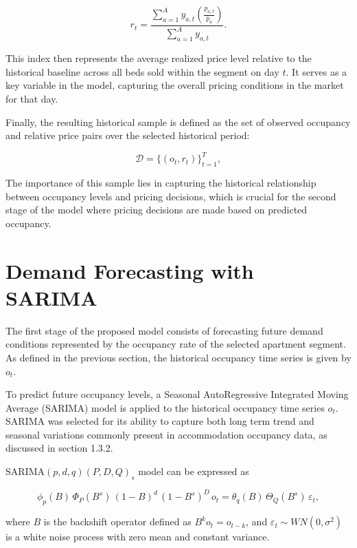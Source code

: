 \begin{equation}
    r_t=
    \frac{\sum_{a=1}^{A} y_{a,t}\left(\frac{p_{a,t}}{\bar{p}_a}\right)}
    {\sum_{a=1}^{A} y_{a,t}}.
\end{equation}

This index then represents the average realized price level relative to the historical baseline across all beds sold within the segment on day $t$. It serves as a key variable in the model, capturing the overall pricing conditions in the market for that day.

Finally, the resulting historical sample is defined as the set of observed occupancy and relative price pairs over the selected historical period:

\begin{equation}
    \mathcal D = {\{(o_t, r_t)\}}_{t=1}^T,
\end{equation}

The importance of this sample lies in capturing the historical relationship between occupancy levels and pricing decisions, which is crucial for the second stage of the model where pricing decisions are made based on predicted occupancy.


\section{Demand Forecasting with SARIMA}
The first stage of the proposed model consists of forecasting future demand conditions represented by the occupancy rate of the selected apartment segment. As defined in the previous section, the historical occupancy time series is given by $o_t$.

To predict future occupancy levels, a Seasonal AutoRegressive Integrated Moving Average (SARIMA) model is applied to the historical occupancy time series $o_t$. SARIMA was selected for its ability to capture both long term trend and seasonal variations commonly present in accommodation occupancy data, as discussed in section 1.3.2.

$\mathrm{SARIMA}(p,d,q)(P,D,Q)_s$ model can be expressed as

\begin{equation}
    \phi_p(B)\,\Phi_P(B^s)\,(1-B)^d\,(1-B^s)^D\, o_t
    =
    \theta_q(B)\,\Theta_Q(B^s)\,\varepsilon_t,
\end{equation}

where $B$ is the backshift operator defined as $B^k o_t = o_{t-k}$, and $\varepsilon_t \sim WN(0,\sigma^2)$ is a white noise process with zero mean and constant variance.

